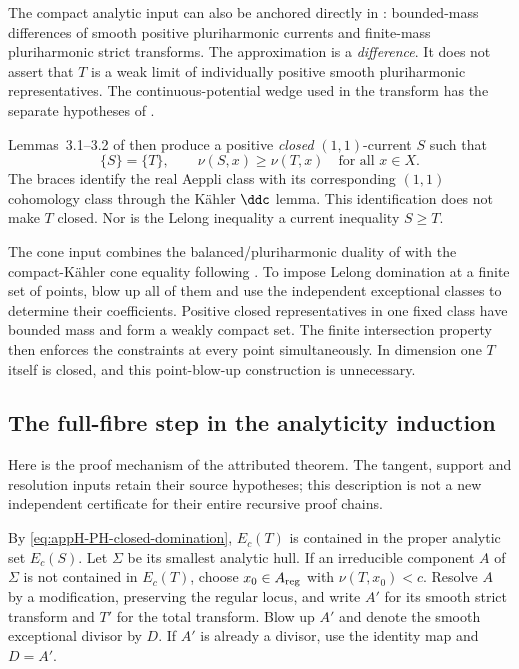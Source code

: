 The compact analytic input can also be anchored directly in
\cite[Theorem~4.1 and Corollary~4.2, printed pp.~965--966]{DS04}:
bounded-mass differences of smooth positive pluriharmonic currents
and finite-mass pluriharmonic strict transforms. The approximation
is a \emph{difference}. It does not assert that $T$ is a weak limit
of individually positive smooth pluriharmonic representatives.
The continuous-potential wedge used in the transform has the separate
hypotheses of \cite[Theorem~5.1, printed pp.~967--969]{DS04}.

Lemmas~3.1--3.2 of \cite{DinhNguyenNguyen26SiuV2} then produce
a positive \emph{closed} $(1,1)$-current $S$ such that
\begin{equation*}
 \{S\}=\{T\},\qquad \nu(S,x)\geq\nu(T,x)\quad\text{for all }x\in X.
\tag{H.58}\label{eq:appH-PH-closed-domination}
\end{equation*}
The braces identify the real Aeppli class with its corresponding
$(1,1)$ cohomology class through the K\"ahler $\ddc$ lemma.
This identification does not make $T$ closed. Nor is the Lelong
inequality a current inequality $S\geq T$.

The cone input combines the balanced/pluriharmonic duality of
\cite[Lemma~3.3 and Remark~3.4, actual pp.~11--12]{FuXiao14ConesV2}
with the compact-K\"ahler cone equality following
\cite[Corollaries~1.2 and~1.4]{Tosatti26MorseV2}.
To impose Lelong domination at a finite set of points, blow up all
of them and use the independent exceptional classes to determine
their coefficients. Positive closed representatives in one fixed
class have bounded mass and form a weakly compact set. The finite
intersection property then enforces the constraints at every point
simultaneously. In dimension one $T$ itself is closed, and this
point-blow-up construction is unnecessary.

\subsection{The full-fibre step in the analyticity induction}
\label{sec:appH-PH-full-fibre}

Here is the proof mechanism of the attributed theorem. The tangent,
support and resolution inputs retain their source hypotheses; this
description is not a new independent certificate for their entire
recursive proof chains.

By \eqref{eq:appH-PH-closed-domination}, $E_c(T)$ is contained in
the proper analytic set $E_c(S)$. Let $\Sigma$ be its smallest analytic
hull. If an irreducible component $A$ of $\Sigma$ is not contained
in $E_c(T)$, choose $x_0\in A_{\rm reg}$ with $\nu(T,x_0)<c$.
Resolve $A$ by a modification, preserving the regular locus, and
write $A'$ for its smooth strict transform and $T'$ for the total
transform. Blow up $A'$ and denote the smooth exceptional divisor
by $D$. If $A'$ is already a divisor, use the identity map and $D=A'$.

